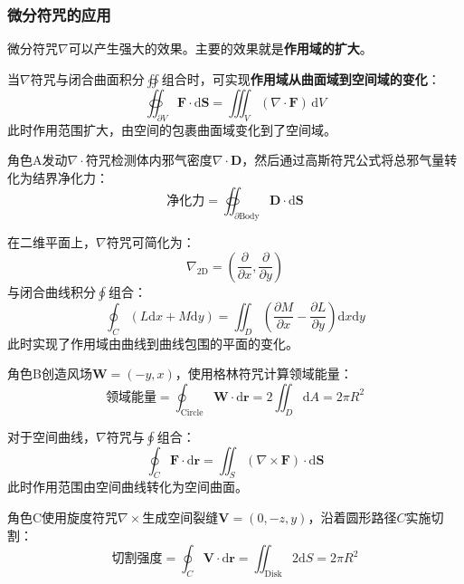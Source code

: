 \documentclass[lang=cn,newtx,10pt,scheme=chinese]{elegantbook}
\newcommand{\md}{\mathrm{d}}
\begin{document}
\subsubsection{微分符咒的应用}
微分符咒$\nabla$可以产生强大的效果。主要的效果就是\textbf{作用域的扩大}。

\begin{theorem}[高斯符咒公式]
    当$\nabla$符咒与闭合曲面积分$\oiint$组合时，可实现\textbf{作用域从曲面域到空间域的变化}：
    \[
        \oiint_{\partial V} \bm{F}\cdot\mathrm{d}\bm{S}=\iiint_V (\nabla\cdot\bm{F}) \,\md V
    \]
    此时作用范围扩大，由空间的包裹曲面域变化到了空间域。
\end{theorem}

\begin{example}[净化结界展开]
    角色A发动$\nabla\cdot$符咒检测体内邪气密度$\nabla\cdot\bm{D}$，然后通过高斯符咒公式将总邪气量转化为结界净化力：
    \[
        \text{净化力} = \oiint_{\partial \text{Body}} \bm{D}\cdot\mathrm{d}\bm{S}
    \]
\end{example}

\begin{theorem}[格林符咒公式]
    在二维平面上，$\nabla$符咒可简化为：
    \[
        \nabla_{\text{2D}} = \left(\frac{\partial}{\partial x}, \frac{\partial}{\partial y}\right)
    \]
    与闭合曲线积分$\oint$组合：
    \[
        \oint_C (L\mathrm{d}x + M\mathrm{d}y) = \iint_D \left(\frac{\partial M}{\partial x} - \frac{\partial L}{\partial y}\right) \mathrm{d}x\mathrm{d}y
    \]
    此时实现了作用域由曲线到曲线包围的平面的变化。
\end{theorem}

\begin{example}[风之领域]
    角色B创造风场$\bm{W} = (-y,x)$，使用格林符咒计算领域能量：
    \[
        \text{领域能量} = \oint_{\text{Circle}} \bm{W}\cdot\mathrm{d}\bm{r} = 2\iint_{D} \mathrm{d}A = 2\pi R^2
    \]
\end{example}

\begin{theorem}[斯托克斯符咒公式]
    对于空间曲线，$\nabla$符咒与$\oint$组合：
    \[
        \oint_C \bm{F}\cdot\mathrm{d}\bm{r} = \iint_S (\nabla\times\bm{F})\cdot\mathrm{d}\bm{S}
    \]
    此时作用范围由空间曲线转化为空间曲面。
\end{theorem}

\begin{example}[空间切割]
    角色C使用旋度符咒$\nabla\times$生成空间裂缝$\bm{V} = (0,-z,y)$，沿着圆形路径$C$实施切割：
    \[
        \text{切割强度} = \oint_C \bm{V}\cdot\mathrm{d}\bm{r} = \iint_{\text{Disk}} 2\mathrm{d}S = 2\pi R^2
    \]
\end{example}
\end{document}
